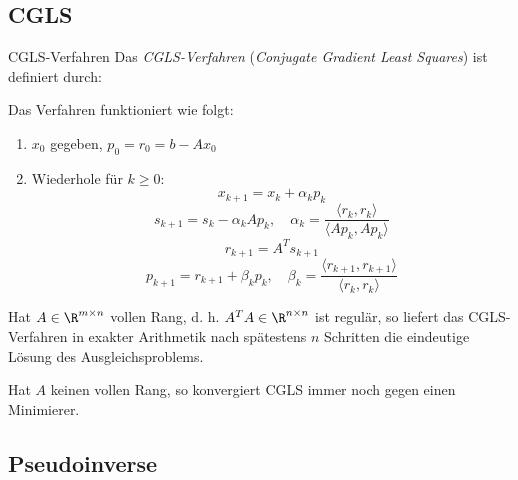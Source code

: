 \subsection{CGLS}

\begin{bonus}{CGLS-Verfahren}
    Das \emph{CGLS-Verfahren} (\emph{Conjugate Gradient Least Squares}) ist definiert durch:

    Das Verfahren funktioniert wie folgt:
    \begin{enumerate}
        \item $x_0$ gegeben, $p_0 = r_0 = b - Ax_0$
        \item Wiederhole für $k \geq 0$:
              \[ x_{k+1} = x_k + \alpha_k p_k \]
              \[ s_{k+1} = s_k - \alpha_k A p_k, \quad \alpha_k = \frac{\langle r_k, r_k \rangle}{\langle A p_k, A p_k \rangle} \]
              \[ r_{k+1} = A^T s_{k+1} \]
              \[ p_{k+1} = r_{k+1} + \beta_k p_k, \quad \beta_k = \frac{\langle r_{k+1}, r_{k+1} \rangle}{\langle r_k, r_k \rangle}\]
    \end{enumerate}

    Hat $A \in \R^{m \times n}$ vollen Rang, d. h. $A^TA \in \R^{n \times n}$ ist regulär, so liefert das CGLS-Verfahren in exakter Arithmetik nach spätestens $n$ Schritten die eindeutige Lösung des Ausgleichsproblems.

    Hat $A$ keinen vollen Rang, so konvergiert CGLS immer noch gegen einen Minimierer.
\end{bonus}

\subsection{Pseudoinverse}

